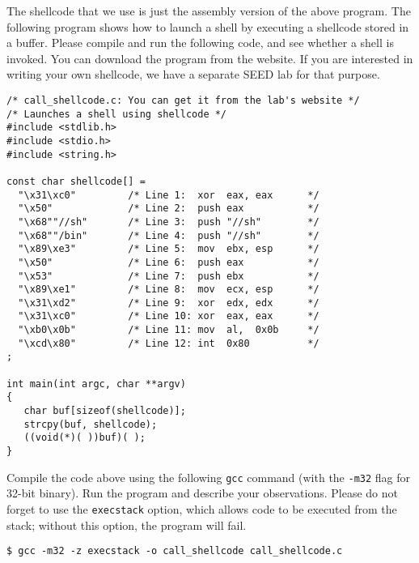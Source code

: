 The shellcode that we use is just the assembly version of the above program. The following
program shows how to launch a shell by executing a shellcode stored in a buffer. Please
compile and run the following code, and see whether a shell is invoked. You can download
the program from the website. If you are interested in writing your own shellcode, 
we have a separate SEED lab for that purpose. 


\begin{lstlisting}
/* call_shellcode.c: You can get it from the lab's website */
/* Launches a shell using shellcode */
#include <stdlib.h>
#include <stdio.h>
#include <string.h>

const char shellcode[] =
  "\x31\xc0"         /* Line 1:  xor  eax, eax      */
  "\x50"             /* Line 2:  push eax           */
  "\x68""//sh"       /* Line 3:  push "//sh"        */
  "\x68""/bin"       /* Line 4:  push "//sh"        */
  "\x89\xe3"         /* Line 5:  mov  ebx, esp      */
  "\x50"             /* Line 6:  push eax           */
  "\x53"             /* Line 7:  push ebx           */
  "\x89\xe1"         /* Line 8:  mov  ecx, esp      */
  "\x31\xd2"         /* Line 9:  xor  edx, edx      */
  "\x31\xc0"         /* Line 10: xor  eax, eax      */
  "\xb0\x0b"         /* Line 11: mov  al,  0x0b     */
  "\xcd\x80"         /* Line 12: int  0x80          */
;

int main(int argc, char **argv)
{
   char buf[sizeof(shellcode)];
   strcpy(buf, shellcode);
   ((void(*)( ))buf)( );
} 
\end{lstlisting}
 

Compile the code above using the following \texttt{gcc} command (with the 
\texttt{-m32} flag for 32-bit binary). Run the program
and describe your observations. 
Please do not forget to use the {\tt execstack} option, which allows 
code to be executed from the stack; without this option, the program will fail.


\begin{lstlisting}
$ gcc -m32 -z execstack -o call_shellcode call_shellcode.c
\end{lstlisting}

